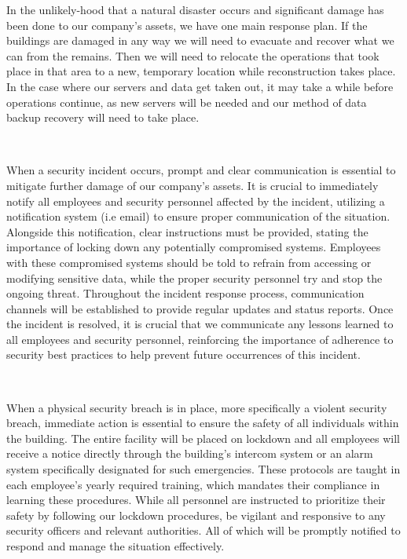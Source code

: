 \documentclass[12pt,a4paper]{report}
\begin{document}
In the unlikely-hood that a natural disaster occurs and significant damage has been done to our company's assets, we have one main response plan.
If the buildings are damaged in any way we will need to evacuate and recover what we can from the remains.
Then we will need to relocate the operations that took place in that area to a new, temporary location while reconstruction takes place.
In the case where our servers and data get taken out, it may take a while before operations continue, as new servers will be needed and our method of data backup recovery will need to take place.

\

When a security incident occurs, prompt and clear communication is essential to mitigate further damage of our company's assets.
It is crucial to immediately notify all employees and security personnel affected by the incident, utilizing a notification system (i.e email) to ensure proper communication of the situation. 
Alongside this notification, clear instructions must be provided, stating the importance of locking down any potentially compromised systems. 
Employees with these compromised systems should be told to refrain from accessing or modifying sensitive data, while the proper security personnel try and stop the ongoing threat. 
Throughout the incident response process, communication channels will be established to provide regular updates and status reports.
Once the incident is resolved, it is crucial that we communicate any lessons learned to all employees and security personnel, reinforcing the importance of adherence to security best practices to help prevent future occurrences of this incident.

\

When a physical security breach is in place, more specifically a violent security breach, immediate action is essential to ensure the safety of all individuals within the building.
The entire facility will be placed on lockdown and all employees will receive a notice directly through the building's intercom system or an alarm system specifically designated for such emergencies.
These protocols are taught in each employee's yearly required training, which mandates their compliance in learning these procedures. 
While all personnel are instructed to prioritize their safety by following our lockdown procedures, be vigilant and responsive to any security officers and relevant authorities.
All of which will be promptly notified to respond and manage the situation effectively.
\end{document}
